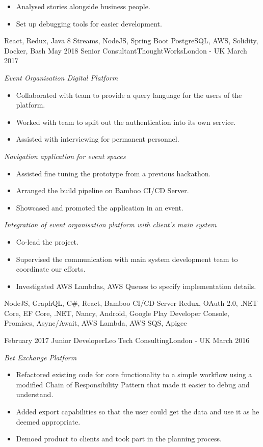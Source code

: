 \begin{experiences}
{\begin{itemize}
          \item Analysed stories alongside business people.
          \item Set up debugging tools for easier development.
        \end{itemize}
      }
      {React, Redux, Java 8 Streams, NodeJS, Spring Boot}
      {PostgreSQL, AWS, Solidity, Docker, Bash}
    \emptySeparator
    \experience
      {May 2018}
      {Senior Consultant}{ThoughtWorks}{London - UK}
      {March 2017}
      {
        \emph{Event Organisation Digital Platform}
        \begin{itemize}
          \item Collaborated with team to provide a query language for the users of the platform.
          \item Worked with team to split out the authentication into its own service.
          \item Assisted with interviewing for permanent personnel.
        \end{itemize}

        \emph{Navigation application for event spaces}
        \begin{itemize}
          \item Assisted fine tuning the prototype from a previous hackathon.
          \item Arranged the build pipeline on Bamboo CI/CD Server.
          \item Showcased and promoted the application in an event.
        \end{itemize}

        \emph{Integration of event organisation platform with client's main system}
        \begin{itemize}
          \item Co-lead the project.
          \item Supervised the communication with main system development team to coordinate our efforts.
          \item Investigated AWS Lambdas, AWS Queues to specify implementation details.
        \end{itemize}
      }
      {NodeJS, GraphQL, C\#, React, Bamboo CI/CD Server}
      {Redux, OAuth 2.0, .NET Core, EF Core, .NET, Nancy, Android, Google Play Developer Console, Promises, Async/Await, AWS Lambda, AWS SQS, Apigee}
    \emptySeparator

    \experience
      {February 2017}
      {Junior Developer}{Leo Tech Consulting}{London - UK}
      {March 2016}
      {
        \emph{Bet Exchange Platform}
        \begin{itemize}
          \item Refactored existing code for core functionality to a simple workflow using a modified Chain of Responsibility Pattern that made it easier to debug and understand.
          \item Added export capabilities so that the user could get the data and use it as he deemed appropriate.
          \item Demoed product to clients and took part in the planning process.
        \end{itemize}

}
\end{experiences}
